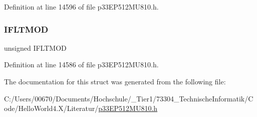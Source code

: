 Definition at line 14596 of file p33\+E\+P512\+M\+U810.\+h.

\mbox{\label{structtag_f_c_l_c_o_n3_b_i_t_s_a4573eed251d96a98a6b5ba1c7cc30451}} 
\subsubsection{\texorpdfstring{I\+F\+L\+T\+M\+OD}{IFLTMOD}}
{\footnotesize\ttfamily unsigned I\+F\+L\+T\+M\+OD}



Definition at line 14586 of file p33\+E\+P512\+M\+U810.\+h.



The documentation for this struct was generated from the following file\+:\begin{DoxyCompactItemize}
\item 
C\+:/\+Users/00670/\+Documents/\+Hochschule/\+\_\+\+Tier1/73304\+\_\+\+Technische\+Informatik/\+Code/\+Hello\+World4.\+X/\+Literatur/\hyperlink{p33_e_p512_m_u810_8h}{p33\+E\+P512\+M\+U810.\+h}\end{DoxyCompactItemize}
